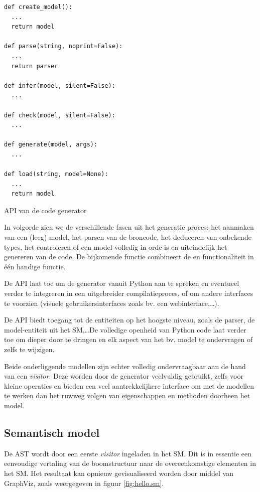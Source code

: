 \begin{listing}[ht]
  \begin{verbatim}
def create_model():
  ...
  return model

def parse(string, noprint=False):
  ...
  return parser

def infer(model, silent=False):
  ...

def check(model, silent=False):
  ...

def generate(model, args):
  ...

def load(string, model=None):
  ...
  return model
  \end{verbatim}
  \vspace{-5mm}
  \caption{API van de code generator}
  \label{lst:codegen-api}
\end{listing}

In volgorde zien we de verschillende fasen uit het generatie proces: het
aanmaken van een (leeg) model, het parsen van de broncode, het deduceren van
onbekende types, het controleren of een model volledig in orde is en
uiteindelijk het genereren van de code. De bijkomende  functie
combineert de  en  functionaliteit in \'e\'en
handige functie.

De API laat toe om de generator vanuit Python aan te spreken en eventueel
verder te integreren in een uitgebreider compilatieproces, of om andere
interfaces te voorzien (visuele gebruikersinterfaces zoals bv. een
webinterface,\dots).

De API biedt toegang tot de entiteiten op het hoogste niveau, zoals de parser,
de model-entiteit uit het SM,\dots De volledige openheid van Python code laat
verder toe om dieper door te dringen en elk aspect van het bv. model te
ondervragen of zelfs te wijzigen.

Beide onderliggende modellen zijn echter volledig ondervraagbaar aan de hand
van een \emph{visitor}. Deze worden door de generator veelvuldig gebruikt,
zelfs voor kleine operaties en bieden een veel aantrekkelijkere interface om
met de modellen te werken dan het ruwweg volgen van eigenschappen en methoden
doorheen het model.

\subsection{Semantisch model}
\label{subsection:devel-semantic-model}

De AST wordt door een eerste \emph{visitor} ingeladen in het SM. Dit is in
essentie een eenvoudige vertaling van de boomstructuur naar de overeenkomstige
elementen in het SM. Het resultaat kan opnieuw gevisualiseerd worden door
middel van GraphViz, zoals weergegeven in figuur \ref{fig:hello.sm}.

